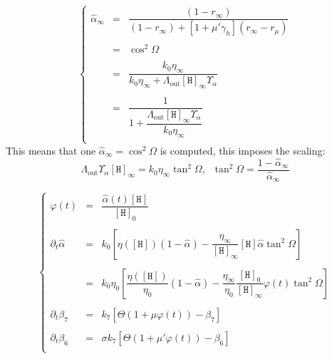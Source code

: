 \documentclass[aps,onecolumn,11pt]{revtex4}
\newcommand{\mychem}[1]{\mathtt{#1}}
\newcommand{\myconc}[1]{\left\lbrack{#1}\right\rbrack}
\newcommand{\spproton}{\mychem{H}}
\newcommand{\proton}{\myconc{\spproton}}
\newcommand{\LiAll}{\Lambda}
\newcommand{\LiAllOut}{{\LiAll}_{\mathrm{out}}}
\begin{document}
\begin{equation}
\left\lbrace
\begin{array}{rcl}
	\hat\alpha_\infty & = & \dfrac{\left(1-r_\infty\right)}
	{ \left(1-r_\infty\right) + 
	\left[1+\mu' \gamma_h\right] \left(r_\infty-r_\mu\right)
	} \\
	\\
	& = & \cos^2 \Omega\\
	\\
	& = & \dfrac{k_0\eta_\infty}{k_0\eta_\infty+\LiAllOut \proton_\infty \Upsilon_\alpha}\\
	\\
	& = & \dfrac{1}{1+\dfrac{\LiAllOut \proton_\infty \Upsilon_\alpha}{k_0\eta_\infty}}\\
\end{array}
\right.
\end{equation}
This means that one $\hat\alpha_\infty = \cos^2 \Omega $ is computed, this imposes the scaling:
\begin{equation}
	\LiAllOut \Upsilon_\alpha \proton_\infty = {k_0\eta_\infty} \tan^2\Omega,\;\;  \tan^2\Omega = \dfrac{1-\hat\alpha_\infty}{\hat\alpha_\infty}
\end{equation}


\begin{equation}
\left\lbrace
\begin{array}{rcl}
	 \varphi(t) & = & \dfrac{\hat\alpha(t) \proton}{\proton_0}\\
	 \\
	  \partial_t \hat\alpha & = &
	 k_0  \left[ \eta\left(\proton\right) \left(1-\hat\alpha\right) 
	 -  \dfrac{\eta_\infty}{\proton_\infty} \proton \hat\alpha \tan^2\Omega\right]   \\
	 \\
	 & = &
	 k_0 \eta_0 \left[ \dfrac{\eta( \proton )}{\eta_0} \left(1-\hat\alpha\right) 
	 - \dfrac{\eta_\infty}{\eta_0} \dfrac{\proton_0}{\proton_\infty} \varphi(t) \tan^2\Omega\right]   \\
	 \\
	\partial_t \beta_7 & = & k_7 \left[ \Theta \left( 1 + \mu \varphi(t) \right) - \beta_7 \right] \\
	\\
	\partial_t \beta_6 & = & \sigma k_7 \left[ \Theta \left( 1 + \mu' \varphi(t) \right) -  \beta_6 \right] \\
\end{array}
\right.
\end{equation}
\end{document}
